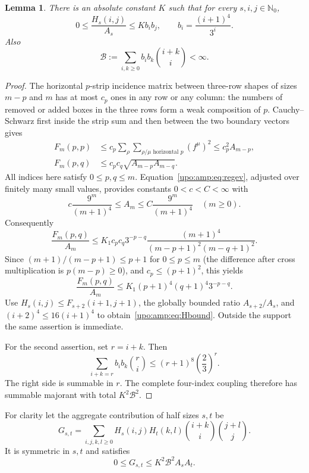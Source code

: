 \documentclass[11pt,letterpaper]{article}
\newtheorem{lemma}[theorem]{Lemma}
\theoremstyle{remark}\newtheorem{remark}[theorem]{Remark}
\numberwithin{equation}{section}
\newcommand{\N}{\mathbb N_0}
\begin{document}
\begin{lemma}\label{upo:amp:lem:domination}
There is an absolute constant $K$ such that for every $s,i,j\in\N$,
\begin{equation}\label{upo:amp:eq:Hbound}
0\le \frac{H_s(i,j)}{A_s}\le Kb_ib_j,
\qquad b_i=\frac{(i+1)^4}{3^i}.
\end{equation}
Also
\begin{equation}\label{upo:amp:eq:Bfinite}
\mathcal B:=\sum_{i,k\ge0}b_ib_k\binom{i+k}{i}<\infty.
\end{equation}
\end{lemma}
\begin{proof}
The horizontal $p$-strip incidence matrix between three-row shapes of
sizes $m-p$ and $m$ has at most $c_p$ ones in any row or any column:
the numbers of removed or added boxes in the three rows form a weak
composition of $p$. Cauchy--Schwarz first inside the strip sum and then
between the two boundary vectors gives
\begin{align}
F_m(p,p)&\le c_p\sum_\rho\sum_{\rho/\mu\text{ horizontal }p}
(f^\mu)^2\le c_p^2 A_{m-p},\label{upo:amp:eq:diag}\\
F_m(p,q)&\le c_pc_q\sqrt{A_{m-p}A_{m-q}}.\label{upo:amp:eq:CS}
\end{align}
All indices here satisfy $0\le p,q\le m$.
Equation~\eqref{upo:amp:eq:regev}, adjusted over finitely many small values,
provides constants $0<c<C<\infty$ with
\begin{equation}\label{upo:amp:eq:globalA}
c\frac{9^m}{(m+1)^4}\le A_m\le C\frac{9^m}{(m+1)^4}
\quad(m\ge0).
\end{equation}
Consequently
\[
\frac{F_m(p,q)}{A_m}\le K_1c_pc_q3^{-p-q}
\frac{(m+1)^4}{(m-p+1)^2(m-q+1)^2}.
\]
Since $(m+1)/(m-p+1)\le p+1$ for $0\le p\le m$
(the difference after cross multiplication is $p(m-p)\ge0$), and
$c_p\le(p+1)^2$, this yields
\[
\frac{F_m(p,q)}{A_m}\le K_1(p+1)^4(q+1)^4 3^{-p-q}.
\]
Use $H_s(i,j)\le F_{s+2}(i+1,j+1)$, the globally bounded ratio
$A_{s+2}/A_s$, and $(i+2)^4\le16(i+1)^4$ to obtain~\eqref{upo:amp:eq:Hbound}.
Outside the support the same assertion is immediate.

For the second assertion, set $r=i+k$. Then
\[
\sum_{i+k=r}b_ib_k\binom ri
\le (r+1)^8\left(\frac23\right)^r.
\]
The right side is summable in $r$. The complete four-index coupling
therefore has summable majorant with total $K^2\mathcal B^2$.
\end{proof}

For clarity let the aggregate contribution of half sizes $s,t$ be
\[
G_{s,t}=\sum_{i,j,k,l\ge0}H_s(i,j)H_t(k,l)
\binom{i+k}{i}\binom{j+l}{j}.
\]
It is symmetric in $s,t$ and satisfies
\begin{equation}\label{upo:amp:eq:Gbound}
0\le G_{s,t}\le K^2\mathcal B^2 A_sA_t.
\end{equation}
\end{document}
